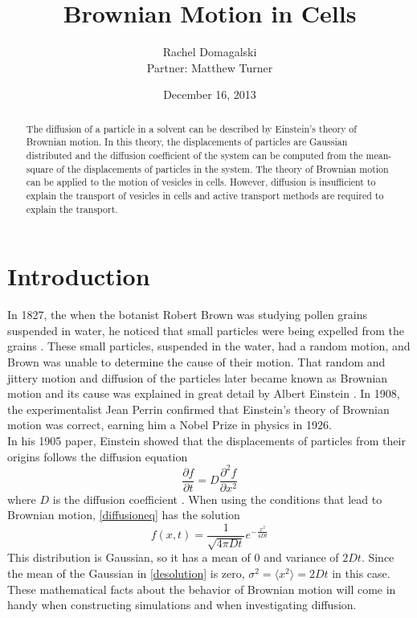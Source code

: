 \documentclass[11pt,letterpaper]{article}
\title{Brownian Motion in Cells}
\author{Rachel Domagalski\\
Partner: Matthew Turner}
\date{December 16, 2013}
\begin{document}
\maketitle

\begin{abstract}
    The diffusion of a particle in a solvent can be described by Einstein's
    theory of Brownian motion. In this theory, the displacements of particles
    are Gaussian distributed and the diffusion coefficient of the system can be
    computed from the mean-square of the displacements of particles in the
    system. The theory of Brownian motion can be applied to the motion of
    vesicles in cells. However, diffusion is insufficient to explain the
    transport of vesicles in cells and active transport methods are required to
    explain the transport.
\end{abstract}

\section{Introduction}


In 1827, the when the botanist Robert Brown was studying pollen grains suspended
in water, he noticed that small particles were being expelled from the grains
\cite{BMWikipedia}. These small particles, suspended in the water, had a random
motion, and Brown was unable to determine the cause of their motion. That random
and jittery motion and diffusion of the particles later became known as Brownian
motion and its cause was explained in great detail by Albert Einstein
\cite{EinsteinBrownian}. In 1908, the experimentalist Jean Perrin confirmed that
Einstein's theory of Brownian motion was correct, earning him a Nobel Prize in
physics in 1926.\\

In his 1905 paper, Einstein showed that the displacements of particles from
their origins follows the diffusion equation
\begin{equation}
    \frac{\partial f}{\partial t} = D \frac{\partial^2 f}{\partial x^2}
    \label{diffusioneq}
\end{equation}
where $D$ is the diffusion coefficient \cite{EinsteinBrownian}. When using the
conditions that lead to Brownian motion, \eqref{diffusioneq} has the solution
\begin{equation}
    f\left(x, t\right) = \frac{1}{\sqrt{4\pi Dt}} e^{-\frac{x^2}{4Dt}}
    \label{desolution}
\end{equation}
This distribution is Gaussian, so it has a mean of 0 and variance of $2Dt$.
Since the mean of the Gaussian in \eqref{desolution} is zero, $\sigma^2 =
\langle x^2 \rangle = 2Dt$ in this case. These mathematical facts about the
behavior of Brownian motion will come in handy when constructing simulations and
when investigating diffusion.\\
\end{document}
